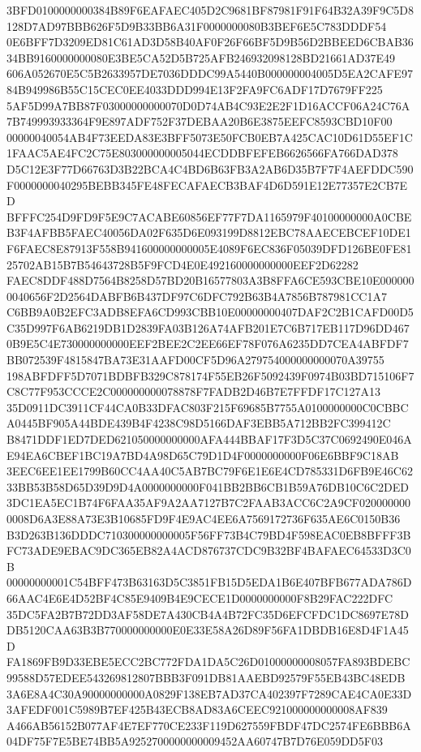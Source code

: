 \documentclass[UTF8,fontset=fandol,zihao=-4,a4paper]{ctexart}
\begin{document}
{{3BFD0100000000384B89F6EAFAEC405D2C9681BF87981F91F64B32A39F9C5D8128D7AD97BBB626F5D9B33BB6A31F0000000080B3BEF6E5C783DDDF54
0E6BFF7D3209ED81C61AD3D58B40AF0F26F66BF5D9B56D2BBEED6CBAB3634BB9160000000080E3BE5CA52D5B725AFB246932098128BD21661AD37E49
606A052670E5C5B2633957DE7036DDDC99A5440B000000004005D5EA2CAFE9784B949986B55C15CEC0EE4033DDD994E13F2FA9FC6ADF17D7679FF225
5AF5D99A7BB87F03000000000070D0D74AB4C93E2E2F1D16ACCF06A24C76A7B749993933364F9E897ADF752F37DEBAA20B6E3875EEFC8593CBD10F00
00000040054AB4F73EEDA83E3BFF5073E50FCB0EB7A425CAC10D61D55EF1C1FAAC5AE4FC2C75E803000000005044ECDDBFEFEB6626566FA766DAD378
D5C12E3F77D66763D3B22BCA4C4BD6B63FB3A2AB6D35B7F7F4AEFDDC590F0000000040295BEBB345FE48FECAFAECB3BAF4D6D591E12E77357E2CB7ED
BFFFC254D9FD9F5E9C7ACABE60856EF77F7DA1165979F40100000000A0CBEB3F4AFBB5FAEC40056DA02F635D6E093199D8812EBC78AAECEBCEF10DE1
F6FAEC8E87913F558B941600000000005E4089F6EC836F05039DFD126BE0FE8125702AB15B7B54643728B5F9FCD4E0E492160000000000EEF2D62282
FAEC8DDF488D7564B8258D57BD20B16577803A3B8FFA6CE593CBE10E0000000040656F2D2564DABFB6B437DF97C6DFC792B63B4A7856B787981CC1A7
C6BB9A0B2EFC3ADB8EFA6CD993CBB10E00000000407DAF2C2B1CAFD00D5C35D997F6AB6219DB1D2839FA03B126A74AFB201E7C6B717EB117D96DD467
0B9E5C4E730000000000EEF2BEE2C2EE66EF78F076A6235DD7CEA4ABFDF7BB072539F4815847BA73E31AAFD00CF5D96A279754000000000070A39755
198ABFDFF5D7071BDBFB329C878174F55EB26F5092439F0974B03BD715106F7C8C77F953CCCE2C000000000078878F7FADB2D46B7E7FFDF17C127A13
35D0911DC3911CF44CA0B33DFAC803F215F69685B7755A0100000000C0CBBCA0445BF905A44BDE439B4F4238C98D5166DAF3EBB5A712BB2FC399412C
B8471DDF1ED7DED621050000000000AFA444BBAF17F3D5C37C0692490E046AE94EA6CBEF1BC19A7BD4A98D65C79D1D4F0000000000F06E6BBF9C18AB
3EEC6EE1EE1799B60CC4AA40C5AB7BC79F6E1E6E4CD785331D6FB9E46C6233BB53B58D65D39D9D4A0000000000F041BB2BB6CB1B59A76DB10C6C2DED
3DC1EA5EC1B74F6FAA35AF9A2AA7127B7C2FAAB3ACC6C2A9CF0200000000008D6A3E88A73E3B10685FD9F4E9AC4EE6A7569172736F635AE6C0150B36
B3D263B136DDDC710300000000005F56FF73B4C79BD4F598EAC0EB8BFFF3BFC73ADE9EBAC9DC365EB82A4ACD876737CDC9B32BF4BAFAEC64533D3C0B
00000000001C54BFF473B63163D5C3851FB15D5EDA1B6E407BFB677ADA786D66AAC4E6E4D52BF4C85E9409B4E9CECE1D0000000000F8B29FAC222DFC
35DC5FA2B7B72DD3AF58DE7A430CB4A4B72FC35D6EFCFDC1DC8697E78DDB5120CAA63B3B770000000000E0E33E58A26D89F56FA1DBDB16E8D4F1A45D
FA1869FB9D33EBE5ECC2BC772FDA1DA5C26D01000000008057FA893BDEBC99588D57EDEE543269812807BBB3F091DB81AAEBD92579F55EB43BC48EDB
3A6E8A4C30A90000000000A0829F138EB7AD37CA402397F7289CAE4CA0E33D3AFEDF001C5989B7EF425B43ECB8AD83A6CEEC921000000000008AF839
A466AB56152B077AF4E7EF770CE233F119D627559FBDF47DC2574FE6BBB6A04DF75F7E5BE74BB5A9252700000000009452AA60747B7D76E059DD5F03
}}
\end{document}
